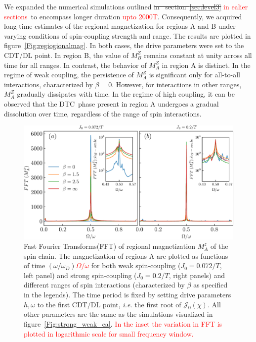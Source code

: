 \documentclass[12pt]{iopart}
\newcommand{\red}[1]{\textcolor{red}{#1}}
\begin{document}
We expanded the numerical simulations outlined \sout{in  section~\ref{sec:level3}} \red{in ealier sections} to encompass longer duration \red{upto 2000T}. Consequently, we acquired long-time estimates of the regional magnetization for regions A and B under varying conditions of spin-coupling strength and range. The results are plotted in figure~\ref{Fig:regiogionalmag}. In both cases, the drive parameters were set to the CDT/DL point. In region B, the value of $M^Z_B$ remains constant at unity across all time for all ranges. In contrast, the behavior of $M^Z_A$ in region A is distinct. In the regime of weak coupling, the persistence of $M^Z_A$ is significant only for all-to-all interactions, characterized by $\beta=0$. However, for interactions in other ranges, $M^Z_A$ gradually dissipates with time. In the regime of high coupling, it can be observed that the DTC phase present in region A undergoes a gradual dissolution over time, regardless of the range of spin interactions. 
\begin{figure}[t]
	\centering
	\hspace{1.5cm}\includegraphics[width = 13cm]{figure10.pdf}
	\caption{
		Fast Fourier Transforms(FFT) of regional magnetization $M^z_{A}$ of the spin-chain. The magnetization of regions A are plotted as functions of time \sout{$(\omega/\omega_D)$}\red{$\Omega/\omega$} for both weak spin-coupling ($J_0=0.072/T$, left panel) and strong spin-coupling ($J_0=0.2/T$, right panels) and different ranges of spin interactions (characterized by $\beta$ as specified in the legends). The time period is fixed by setting drive parameters $h,\omega$ to the first CDT/DL point, \textit{i.e.} the first root of $\mathcal{J}_0(\chi)$. All other parameters are the same as the simulations visualized in figure~\ref{Fig:strong_weak_ea}. \red{In the inset the variation in FFT is plotted in logarithmic scale for small frequency window.}}
	\label{Fig:regionalFFT}
\end{figure}
\end{document}
